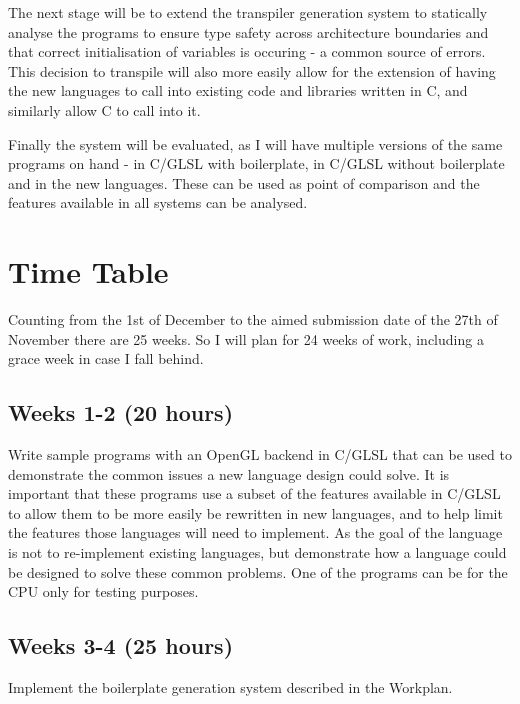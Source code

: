 \documentclass[11pt]{article}
\begin{document}
The next stage will be to extend the transpiler generation system to statically
analyse the programs to ensure type safety across architecture boundaries and
that correct initialisation of variables is occuring - a common source of
errors. This decision to transpile will also more easily allow for the
extension of having the new languages to call into existing code and libraries
written in C, and similarly allow C to call into it.

Finally the system will be evaluated, as I will have multiple versions of the
same programs on hand - in C/GLSL with boilerplate, in C/GLSL without
boilerplate and in the new languages. These can be used as point of comparison
and the features available in all systems can be analysed.




\newpage
\appendix

\section{Time Table}

Counting from the 1st of December to the aimed submission date of the 27th of
November there are 25 weeks. So I will plan for 24 weeks of work, including a
grace week in case I fall behind.

\subsection{Weeks 1-2 (20 hours)}

Write sample programs with an OpenGL backend in C/GLSL that can be used to
demonstrate the common issues a new language design could solve. It is
important that these programs use a subset of the features available in C/GLSL
to allow them to be more easily be rewritten in new languages, and to help
limit the features those languages will need to implement. As the goal of the
language is not to re-implement existing languages, but demonstrate how a
language could be designed to solve these common problems. One of the programs
can be for the CPU only for testing purposes.

\subsection{Weeks 3-4 (25 hours)}

Implement the boilerplate generation system described in the Workplan.
\end{document}
